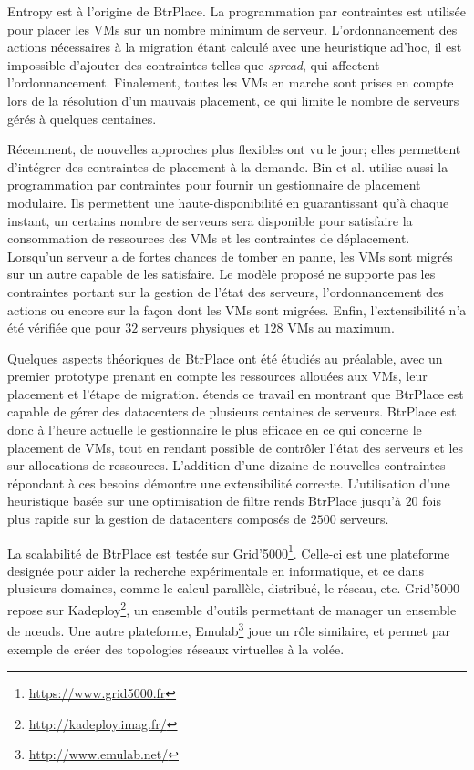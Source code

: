 \documentclass[a4paper]{article}
\begin{document}
Entropy est à l'origine de BtrPlace. La programmation par contraintes
est utilisée pour placer les VMs sur un nombre minimum de serveur.
L'ordonnancement des actions nécessaires à la migration étant calculé
avec une heuristique ad'hoc, il est impossible d'ajouter des
contraintes telles que \textit{spread}, qui affectent l'ordonnancement.
Finalement, toutes les VMs en marche sont prises en compte lors
de la résolution d'un mauvais placement, ce qui limite le nombre
de serveurs gérés à quelques centaines.

Récemment, de nouvelles approches plus flexibles ont vu le jour;
elles permettent d'intégrer des contraintes de placement à la
demande. Bin et al. utilise aussi la programmation par contraintes
pour fournir un gestionnaire de placement modulaire. Ils
permettent une haute-disponibilité en guarantissant qu'à chaque instant,
un certains nombre de serveurs sera disponible pour satisfaire
la consommation de ressources des VMs et les contraintes de
déplacement. Lorsqu'un serveur a de fortes chances de tomber en panne,
les VMs sont migrés sur un autre capable de les satisfaire. Le modèle
proposé ne supporte pas les contraintes portant sur la gestion de
l'état des serveurs, l'ordonnancement des actions ou encore sur la
façon dont les VMs sont migrées. Enfin, l'extensibilité n'a été
vérifiée que pour $32$ serveurs physiques et $128$ VMs au maximum.

Quelques aspects théoriques de BtrPlace ont été étudiés au préalable,
avec un premier prototype prenant en compte les ressources allouées
aux VMs, leur placement et l'étape de migration. \cite{herm2012}
étends ce travail en montrant que BtrPlace est capable de gérer
des datacenters de plusieurs centaines de serveurs. BtrPlace
est donc à l'heure actuelle le gestionnaire le plus efficace en
ce qui concerne le placement de VMs, tout en rendant possible
de contrôler l'état des serveurs et les sur-allocations de ressources.
L'addition d'une dizaine de nouvelles contraintes répondant à
ces besoins démontre une extensibilité correcte. L'utilisation
d'une heuristique basée sur une optimisation de filtre
rends BtrPlace jusqu'à $20$ fois plus rapide sur la gestion de
datacenters composés de $2500$ serveurs.

La scalabilité de BtrPlace est testée sur
Grid'5000\footnote{\url{https://www.grid5000.fr}}. Celle-ci est une
plateforme designée pour aider la recherche expérimentale en informatique,
et ce dans plusieurs domaines, comme le calcul parallèle, distribué, le
réseau, etc. Grid'5000 repose sur Kadeploy\footnote{\url{http://kadeploy.imag.fr/}},
un ensemble d'outils permettant de manager un ensemble de nœuds.
Une autre plateforme, Emulab\footnote{\url{http://www.emulab.net/}} joue
un rôle similaire, et permet par exemple de créer des topologies
réseaux virtuelles à la volée.
\end{document}

